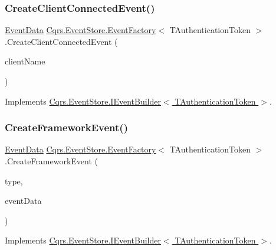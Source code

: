 \subsubsection{\texorpdfstring{Create\+Client\+Connected\+Event()}{CreateClientConnectedEvent()}}
{\footnotesize\ttfamily \hyperlink{classCqrs_1_1Events_1_1EventData}{Event\+Data} \hyperlink{classCqrs_1_1EventStore_1_1EventFactory}{Cqrs.\+Event\+Store.\+Event\+Factory}$<$ T\+Authentication\+Token $>$.Create\+Client\+Connected\+Event (\begin{DoxyParamCaption}\item[{string}]{client\+Name }\end{DoxyParamCaption})}



Implements \hyperlink{interfaceCqrs_1_1EventStore_1_1IEventBuilder_ae11ead7fa69632041e081e60f51c4e9f}{Cqrs.\+Event\+Store.\+I\+Event\+Builder$<$ T\+Authentication\+Token $>$}.

\mbox{\label{classCqrs_1_1EventStore_1_1EventFactory_a91394437675f3185d2105c6a79f7b5aa}} 
\subsubsection{\texorpdfstring{Create\+Framework\+Event()}{CreateFrameworkEvent()}\hspace{0.1cm}{\footnotesize\ttfamily [1/4]}}
{\footnotesize\ttfamily \hyperlink{classCqrs_1_1Events_1_1EventData}{Event\+Data} \hyperlink{classCqrs_1_1EventStore_1_1EventFactory}{Cqrs.\+Event\+Store.\+Event\+Factory}$<$ T\+Authentication\+Token $>$.Create\+Framework\+Event (\begin{DoxyParamCaption}\item[{string}]{type,  }\item[{\hyperlink{interfaceCqrs_1_1Events_1_1IEvent}{I\+Event}$<$ T\+Authentication\+Token $>$}]{event\+Data }\end{DoxyParamCaption})}



Implements \hyperlink{interfaceCqrs_1_1EventStore_1_1IEventBuilder_ab9608f44e12ce029fc98ad0eee53516a}{Cqrs.\+Event\+Store.\+I\+Event\+Builder$<$ T\+Authentication\+Token $>$}.

